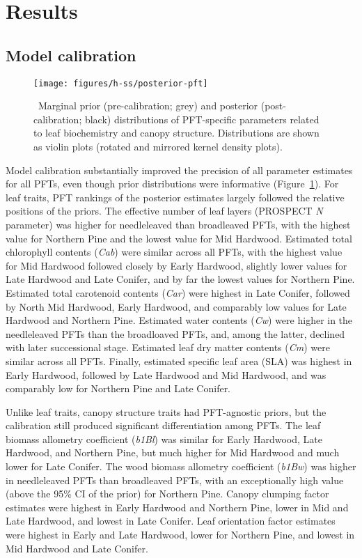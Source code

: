 \section{Results}

\subsection{Model calibration}

\begin{figure}
  \centering
  \texttt{[image: figures/h-ss/posterior-pft]}
  \caption{\label{fig:posterior-pft}\
    Marginal prior (pre-calibration; grey) and posterior (post-calibration; black) distributions of PFT-specific parameters
    related to leaf biochemistry and canopy structure.
    Distributions are shown as violin plots (rotated and mirrored kernel density plots).
  }
\end{figure}

Model calibration substantially improved the precision of all parameter estimates for all PFTs, even though prior distributions were informative (Figure~\ref{fig:posterior-pft}).
For leaf traits, PFT rankings of the posterior estimates largely followed the relative positions of the priors.
The effective number of leaf layers (PROSPECT \emph{N} parameter) was higher for needleleaved than broadleaved PFTs, with the highest value for Northern Pine and the lowest value for Mid Hardwood.
Estimated total chlorophyll contents (\emph{Cab}) were similar across all PFTs, with the highest value for Mid Hardwood followed closely by Early Hardwood, slightly lower values for Late Hardwood and Late Conifer, and by far the lowest values for Northern Pine.
Estimated total carotenoid contents (\emph{Car}) were highest in Late Conifer, followed by North Mid Hardwood, Early Hardwood, and comparably low values for Late Hardwood and Northern Pine.
Estimated water contents (\emph{Cw}) were higher in the needleleaved PFTs than the broadloaved PFTs, and, among the latter, declined with later successional stage.
Estimated leaf dry matter contents (\emph{Cm}) were similar across all PFTs.
Finally, estimated specific leaf area (SLA) was highest in Early Hardwood, followed by Late Hardwood and Mid Hardwood, and was comparably low for Northern Pine and Late Conifer.

Unlike leaf traits, canopy structure traits had PFT-agnostic priors, but the calibration still produced significant differentiation among PFTs.
The leaf biomass allometry coefficient (\emph{b1Bl}) was similar for Early Hardwood, Late Hardwood, and Northern Pine, but much higher for Mid Hardwood and much lower for Late Conifer.
The wood biomass allometry coefficient (\emph{b1Bw}) was higher in needleleaved PFTs than broadleaved PFTs, with an exceptionally high value (above the 95\% CI of the prior) for Northern Pine.
Canopy clumping factor estimates were highest in Early Hardwood and Northern Pine, lower in Mid and Late Hardwood, and lowest in Late Conifer.
Leaf orientation factor estimates were highest in Early and Late Hardwood, lower for Northern Pine, and lowest in Mid Hardwood and Late Conifer.

